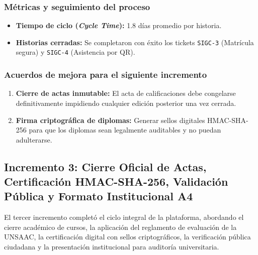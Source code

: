 \subsubsection{Métricas y seguimiento del proceso}
\begin{itemize}[nosep]
    \item \textbf{Tiempo de ciclo (\textit{Cycle Time}):} 1.8 días promedio por historia.
    \item \textbf{Historias cerradas:} Se completaron con éxito los tickets \texttt{SIGC-3} (Matrícula segura) y \texttt{SIGC-4} (Asistencia por QR).
\end{itemize}

\subsubsection{Acuerdos de mejora para el siguiente incremento}
\begin{enumerate}[nosep]
    \item \textbf{Cierre de actas inmutable:} El acta de calificaciones debe congelarse definitivamente impidiendo cualquier edición posterior una vez cerrada.
    \item \textbf{Firma criptográfica de diplomas:} Generar sellos digitales HMAC-SHA-256 para que los diplomas sean legalmente auditables y no puedan adulterarse.
\end{enumerate}

\vspace{0.4cm}

\subsection{Incremento 3: Cierre Oficial de Actas, Certificación HMAC-SHA-256, Validación Pública y Formato Institucional A4}

El tercer incremento completó el ciclo integral de la plataforma, abordando el cierre académico de cursos, la aplicación del reglamento de evaluación de la UNSAAC, la certificación digital con sellos criptográficos, la verificación pública ciudadana y la presentación institucional para auditoría universitaria.


